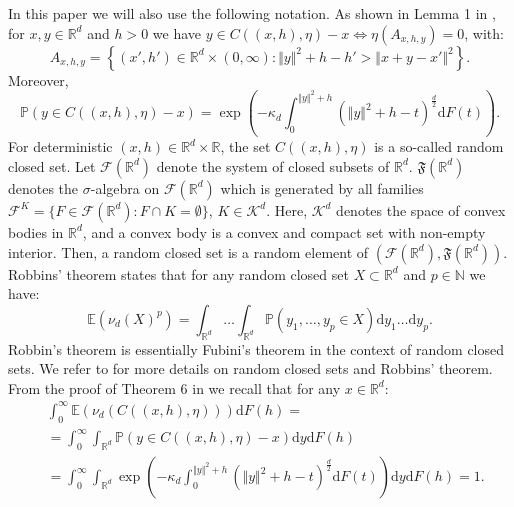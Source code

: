 \documentclass{article}
\newcommand{\NN}{\mathbb{N}}
\newcommand{\RR}{\mathbb{R}}
\newcommand{\PP}{\mathbb{P}}
\newcommand{\EE}{\mathbb{E}}
\theoremstyle{plain}
\theoremstyle{remark}
\theoremstyle{definition}
\begin{document}
In this paper we will also use the following notation. As shown in Lemma 1 in \cite{vdjagt2025b}, for $x,y \in \RR^d$ and $h > 0$ we have $y \in C((x,h),\eta)-x \iff \eta(A_{x,h,y}) = 0$, with:
\begin{equation}
    A_{x,h,y} = \left\{(x',h') \in \RR^d \times (0,\infty): \Vert y \Vert^2 + h - h' > \Vert x + y-x' \Vert^2\right\}. \label{set_A_xhy}
\end{equation}
Moreover, 
\begin{equation}
    \PP\left(y \in C((x,h),\eta)-x\right) = \exp\left(-\kappa_d \int_0^{\Vert y \Vert^2 +h}\left(\Vert y \Vert^2 +h -t \right)^{\frac{d}{2}}\mathrm{d}F(t) \right). \label{point_inclusion_probability}
\end{equation}
For deterministic $(x,h) \in \RR^d \times \RR$, the set $C((x,h),\eta)$ is a so-called random closed set. Let $\mathcal{F}(\RR^d)$ denote the system of closed subsets of $\RR^d$. $\mathfrak{F}(\RR^d)$ denotes the $\sigma$-algebra on $\mathcal{F}(\RR^d)$ which is generated by all families $\mathcal{F}^K = \{F \in \mathcal{F}(\RR^d):F\cap K = \emptyset\}$, $K \in \mathcal{K}^d$. Here, $\mathcal{K}^d$ denotes the space of convex bodies in $\RR^d$, and a convex body is a convex and compact set with non-empty interior. Then, a random closed set is a random element of $(\mathcal{F}(\RR^d), \allowbreak\mathfrak{F}(\RR^d))$. Robbins' theorem states that for any random closed set $X \subset \RR^d$ and $p \in \NN$ we have:
\begin{equation}
    \EE\left(\nu_d(X)^p\right) = \int_{\RR^d}\dots\int_{\RR^d}\PP(y_1,\dots,y_p \in X)\mathrm{d}y_1 \dots \mathrm{d}y_p. \label{Robbins_thm}
\end{equation}
Robbin's theorem is essentially Fubini's theorem in the context of random closed sets. We refer to \cite{Molchanov2017} for more details on random closed sets and Robbins' theorem. From the proof of Theorem 6 in \cite{vdjagt2025b} we recall that for any $x \in \RR^d$:
\begin{align}
    &\int_0^\infty \EE\left(\nu_d(C((x,h),\eta)) \right)\mathrm{d}F(h) = \nonumber\\ 
    &= \int_0^\infty \int_{\RR^d}\PP\left(y \in C((x,h),\eta)-x\right)\mathrm{d}y\mathrm{d}F(h) \nonumber\\
    &=\int_0^\infty\int_{\RR^d}  \exp\left(-\kappa_d \int_0^{\Vert y \Vert^2 +h}\left(\Vert y \Vert^2 +h -t \right)^{\frac{d}{2}}\mathrm{d}F(t) \right)\mathrm{d}y\mathrm{d}F(h) = 1. \label{mean_cell_volume1}
\end{align}
\end{document}
